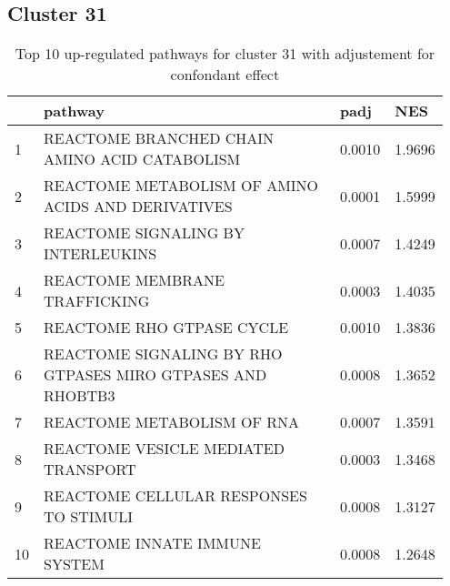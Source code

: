 \documentclass{article}
\begin{document}
\subsection{Cluster 31 }
\begin{table}[H]
\centering
\begin{tabular}{p{0.05\linewidth}p{0.7\linewidth}p{0.1\linewidth}p{0.1\linewidth}}
  \hline
 & pathway & padj & NES \\ 
  \hline
1 & REACTOME BRANCHED CHAIN AMINO ACID CATABOLISM & 0.0010 & 1.9696 \\ 
  2 & REACTOME METABOLISM OF AMINO ACIDS AND DERIVATIVES & 0.0001 & 1.5999 \\ 
  3 & REACTOME SIGNALING BY INTERLEUKINS & 0.0007 & 1.4249 \\ 
  4 & REACTOME MEMBRANE TRAFFICKING & 0.0003 & 1.4035 \\ 
  5 & REACTOME RHO GTPASE CYCLE & 0.0010 & 1.3836 \\ 
  6 & REACTOME SIGNALING BY RHO GTPASES MIRO GTPASES AND RHOBTB3 & 0.0008 & 1.3652 \\ 
  7 & REACTOME METABOLISM OF RNA & 0.0007 & 1.3591 \\ 
  8 & REACTOME VESICLE MEDIATED TRANSPORT & 0.0003 & 1.3468 \\ 
  9 & REACTOME CELLULAR RESPONSES TO STIMULI & 0.0008 & 1.3127 \\ 
  10 & REACTOME INNATE IMMUNE SYSTEM & 0.0008 & 1.2648 \\ 
   \hline
\end{tabular}
\caption{Top 10 up-regulated pathways for cluster 31 with adjustement for confondant effect} 
\label{tab:q3_2_conf_31}
\end{table}
\end{document}
